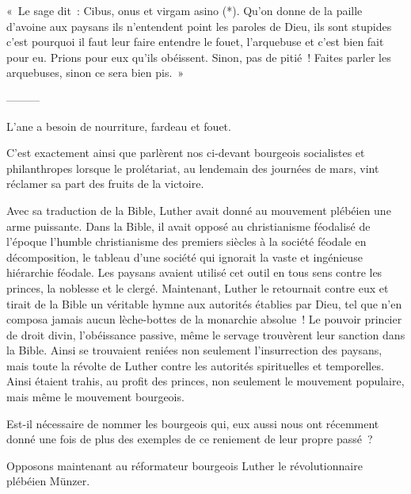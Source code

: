 \documentclass[french,twoside]{book} %
\newenvironment{quoteblock}%
  {\begin{quoting}}
  {\end{quoting}}
\newenvironment{quotebar}{%
    \def\FrameCommand{{\color{rubric!10!}\vrule width 0.5em} \hspace{0.9em}}%
    \def\OuterFrameSep{\itemsep} %
    \MakeFramed {\advance\hsize-\width \FrameRestore}
  }%
  {%
    \endMakeFramed
  }
\renewenvironment{quoteblock}%
  {%
    \savenotes
    \setstretch{0.9}
    \begin{quotebar}
  }
  {%
    \end{quotebar}
    \spewnotes
  }
\begin{document}
\begin{quoteblock}
 \noindent « Le sage dit : Cibus, onus et virgam asino (*). Qu’on donne de la paille d’avoine aux paysans ils n’entendent point les paroles de Dieu, ils sont stupides c’est pourquoi il faut leur faire entendre le fouet, l’arquebuse et c’est bien fait pour eu. Prions pour eux qu’ils obéissent. Sinon, pas de pitié ! Faites parler les arquebuses, sinon ce sera bien pis. »
\end{quoteblock}

———\par
\noindent L’ane a besoin de nourriture, fardeau et fouet.\par
C’est exactement ainsi que parlèrent nos ci-devant bourgeois socialistes et philanthropes lorsque le prolétariat, au lendemain des journées de mars, vint réclamer sa part des fruits de la victoire.\par
Avec sa traduction de la Bible, Luther avait donné au mouvement plébéien une arme puissante. Dans la Bible, il avait opposé au christianisme féodalisé de l’époque l’humble christianisme des premiers siècles à la société féodale en décomposition, le tableau d’une société qui ignorait la vaste et ingénieuse hiérarchie féodale. Les paysans avaient utilisé cet outil en tous sens contre les princes, la noblesse et le clergé. Maintenant, Luther le retournait contre eux et tirait de la Bible un véritable hymne aux autorités établies par Dieu, tel que n’en composa jamais aucun lèche-bottes de la monarchie absolue ! Le pouvoir princier de droit divin, l’obéissance passive, même le servage trouvèrent leur sanction dans la Bible. Ainsi se trouvaient reniées non seulement l’insurrection des paysans, mais toute la révolte de Luther contre les autorités spirituelles et temporelles. Ainsi étaient trahis, au profit des princes, non seulement le mouvement populaire, mais même le mouvement bourgeois.\par
Est-il nécessaire de nommer les bourgeois qui, eux aussi nous ont récemment donné une fois de plus des exemples de ce reniement de leur propre passé ?\par
Opposons maintenant au réformateur bourgeois Luther le révolutionnaire plébéien Münzer.\par
\end{document}
